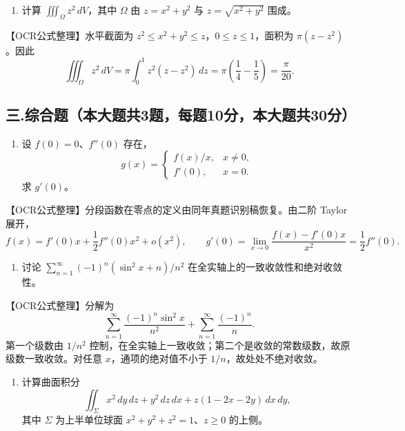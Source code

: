 \documentclass[11pt,fontset=fandol]{ctexart}
\providecommand{\tightlist}{\setlength{\itemsep}{0pt}\setlength{\parskip}{0pt}}
\begin{document}
\begin{enumerate}
\def\labelenumi{\arabic{enumi}.}
\setcounter{enumi}{4}
\tightlist
\item
  计算 \(\iiint_\Omega z^2\,dV\)，其中 \(\Omega\) 由 \(z=x^2+y^2\) 与
  \(z=\sqrt{x^2+y^2}\) 围成。
\end{enumerate}

【OCR公式整理】水平截面为
\(z^2\le x^2+y^2\le z\)，\(0\le z\le1\)，面积为 \(\pi(z-z^2)\)。因此 \[
\iiint_\Omega z^2\,dV=\pi\int_0^1 z^2(z-z^2)\,dz
=\pi\left(\frac14-\frac15\right)=\frac{\pi}{20}.
\]

\subsection{三.综合题（本大题共3题，每题10分，本大题共30分）}\label{ux4e09.ux7efcux5408ux9898ux672cux5927ux9898ux51713ux9898ux6bcfux989810ux5206ux672cux5927ux9898ux517130ux5206}

\begin{enumerate}
\def\labelenumi{\arabic{enumi}.}
\tightlist
\item
  设 \(f(0)=0\)、\(f''(0)\) 存在， \[
  g(x)=\begin{cases}f(x)/x,&x\ne0,\\f'(0),&x=0.\end{cases}
  \] 求 \(g'(0)\)。
\end{enumerate}

【OCR公式整理】分段函数在零点的定义由同年真题识别稿恢复。由二阶 Taylor
展开， \[
f(x)=f'(0)x+\frac12f''(0)x^2+o(x^2),
\qquad g'(0)=\lim_{x\to0}\frac{f(x)-f'(0)x}{x^2}
=\frac12f''(0).
\]

\begin{enumerate}
\def\labelenumi{\arabic{enumi}.}
\setcounter{enumi}{1}
\tightlist
\item
  讨论 \(\sum_{n=1}^\infty(-1)^n(\sin^2x+n)/n^2\)
  在全实轴上的一致收敛性和绝对收敛性。
\end{enumerate}

【OCR公式整理】分解为 \[
\sum_{n=1}^\infty\frac{(-1)^n\sin^2x}{n^2}
+\sum_{n=1}^\infty\frac{(-1)^n}{n}.
\] 第一个级数由 \(1/n^2\)
控制，在全实轴上一致收敛；第二个是收敛的常数级数，故原级数一致收敛。对任意
\(x\)，通项的绝对值不小于 \(1/n\)，故处处不绝对收敛。

\begin{enumerate}
\def\labelenumi{\arabic{enumi}.}
\setcounter{enumi}{2}
\tightlist
\item
  计算曲面积分 \[
  \iint_\Sigma x^2\,dy\,dz+y^2\,dz\,dx+z(1-2x-2y)\,dx\,dy,
  \] 其中 \(\Sigma\) 为上半单位球面 \(x^2+y^2+z^2=1\)、\(z\ge0\)
  的上侧。
\end{enumerate}
\end{document}
